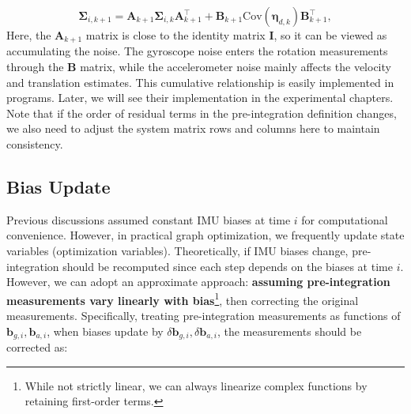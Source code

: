 \begin{equation}\label{eq:preinteg-motion-noise}
	\boldsymbol{\Sigma}_{i, k+1} = \mathbf{A}_{k+1} \boldsymbol{\Sigma}_{i, k} \mathbf{A}_{k+1}^\top + \mathbf{B}_{k+1}
	\mathrm{Cov}(\boldsymbol{\eta}_{d,k}) \mathbf{B}^\top_{k+1},
\end{equation}
Here, the $\mathbf{A}_{k+1}$ matrix is close to the identity matrix $\mathbf{I}$, so it can be viewed as accumulating the noise. The gyroscope noise enters the rotation measurements through the $\mathbf{B}$ matrix, while the accelerometer noise mainly affects the velocity and translation estimates. This cumulative relationship is easily implemented in programs. Later, we will see their implementation in the experimental chapters. Note that if the order of residual terms in the pre-integration definition changes, we also need to adjust the system matrix rows and columns here to maintain consistency.

\subsection{Bias Update}
Previous discussions assumed constant IMU biases at time $i$ for computational convenience. However, in practical graph optimization, we frequently update state variables (optimization variables). Theoretically, if IMU biases change, pre-integration should be recomputed since each step depends on the biases at time $i$. However, we can adopt an approximate approach: \textbf{assuming pre-integration measurements vary linearly with bias}\footnote{While not strictly linear, we can always linearize complex functions by retaining first-order terms.}, then correcting the original measurements. Specifically, treating pre-integration measurements as functions of $\mathbf{b}_{g,i}, \mathbf{b}_{a,i}$, when biases update by $\delta \mathbf{b}_{g,i}, \delta \mathbf{b}_{a,i}$, the measurements should be corrected as:

